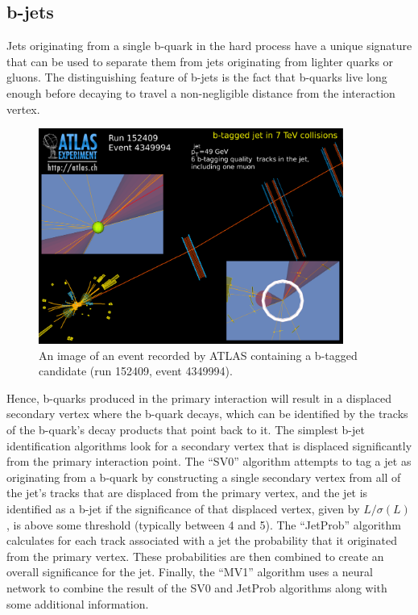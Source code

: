 

\subsection{b-jets}
Jets originating from a single b-quark in the hard process have a unique signature that can be used to separate them from jets originating from lighter quarks or gluons.
The distinguishing feature of b-jets is the fact that b-quarks live long enough before decaying to travel a non-negligible distance from the interaction vertex.

\begin{figure}
  \begin{center}
    \includegraphics[width=100mm]{figures/atlas/BTaggedEvent.png}
  \end{center}
  \caption{An image of an event recorded by ATLAS containing a b-tagged candidate (run 152409, event 4349994).}
  \label{img:BTaggedEvent}
\end{figure}

Hence, b-quarks produced in the primary interaction will result in a displaced secondary vertex where the b-quark decays, which can be identified by the tracks of the b-quark's decay products that point back to it.
The simplest b-jet identification algorithms look for a secondary vertex that is displaced significantly from the primary interaction point.
The ``SV0'' algorithm attempts to tag a jet as originating from a b-quark by constructing a single secondary vertex from all of the jet's tracks that are displaced from the primary vertex, and the jet is identified as a b-jet if the significance of that displaced vertex, given by $L/ \sigma(L)$, is above some threshold (typically between 4 and 5).
The ``JetProb'' algorithm calculates for each track associated with a jet the probability that it originated from the primary vertex.
These probabilities are then combined to create an overall significance for the jet.
Finally, the ``MV1'' algorithm uses a neural network to combine the result of the SV0 and JetProb algorithms along with some additional information.


